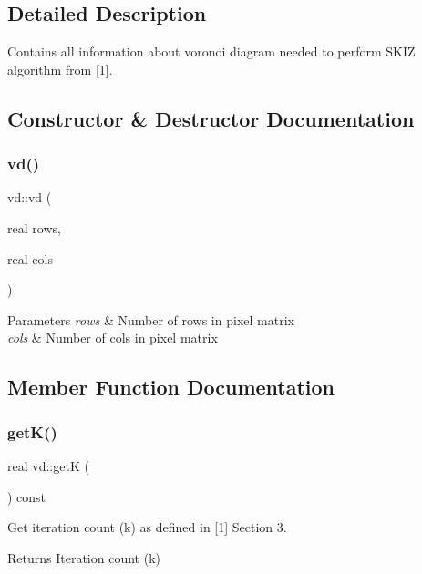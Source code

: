\subsection{Detailed Description}
Contains all information about voronoi diagram needed to perform S\+K\+IZ algorithm from \mbox{[}1\mbox{]}. 

\subsection{Constructor \& Destructor Documentation}
\mbox{\label{classvd_a765c16ee377a2a0f9651d555edd3a158}} 
\subsubsection{\texorpdfstring{vd()}{vd()}}
{\footnotesize\ttfamily vd\+::vd (\begin{DoxyParamCaption}\item[{real}]{rows,  }\item[{real}]{cols }\end{DoxyParamCaption})}


\begin{DoxyParams}{Parameters}
{\em rows} & Number of rows in pixel matrix \\
\hline
{\em cols} & Number of cols in pixel matrix \\
\hline
\end{DoxyParams}


\subsection{Member Function Documentation}
\mbox{\label{classvd_a624f53ae4a7012f267111359e9245f81}} 
\subsubsection{\texorpdfstring{get\+K()}{getK()}}
{\footnotesize\ttfamily real vd\+::getK (\begin{DoxyParamCaption}{ }\end{DoxyParamCaption}) const}

Get iteration count (k) as defined in \mbox{[}1\mbox{]} Section 3. \begin{DoxyReturn}{Returns}
Iteration count (k) 
\end{DoxyReturn}
\mbox{\label{classvd_a37c4ab12669eb276fe7fa4a610310345}} 
